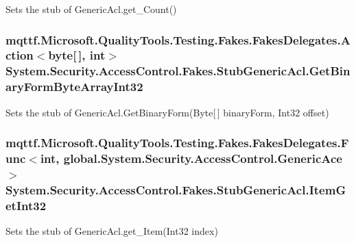 Sets the stub of Generic\-Acl.\-get\-\_\-\-Count()

\hypertarget{class_system_1_1_security_1_1_access_control_1_1_fakes_1_1_stub_generic_acl_ae4a8e8e4e7189dcbf5aba3d132b0bec9}{
\subsubsection[{Get\-Binary\-Form\-Byte\-Array\-Int32}]{\setlength{\rightskip}{0pt plus 5cm}mqttf.\-Microsoft.\-Quality\-Tools.\-Testing.\-Fakes.\-Fakes\-Delegates.\-Action$<$byte\mbox{[}$\,$\mbox{]}, int$>$ System.\-Security.\-Access\-Control.\-Fakes.\-Stub\-Generic\-Acl.\-Get\-Binary\-Form\-Byte\-Array\-Int32}}\label{class_system_1_1_security_1_1_access_control_1_1_fakes_1_1_stub_generic_acl_ae4a8e8e4e7189dcbf5aba3d132b0bec9}


Sets the stub of Generic\-Acl.\-Get\-Binary\-Form(\-Byte\mbox{[}$\,$\mbox{]} binary\-Form, Int32 offset)

\hypertarget{class_system_1_1_security_1_1_access_control_1_1_fakes_1_1_stub_generic_acl_a91f5e476e5158fd55b4a3859962d1212}{
\subsubsection[{Item\-Get\-Int32}]{\setlength{\rightskip}{0pt plus 5cm}mqttf.\-Microsoft.\-Quality\-Tools.\-Testing.\-Fakes.\-Fakes\-Delegates.\-Func$<$int, global.\-System.\-Security.\-Access\-Control.\-Generic\-Ace$>$ System.\-Security.\-Access\-Control.\-Fakes.\-Stub\-Generic\-Acl.\-Item\-Get\-Int32}}\label{class_system_1_1_security_1_1_access_control_1_1_fakes_1_1_stub_generic_acl_a91f5e476e5158fd55b4a3859962d1212}


Sets the stub of Generic\-Acl.\-get\-\_\-\-Item(\-Int32 index)

